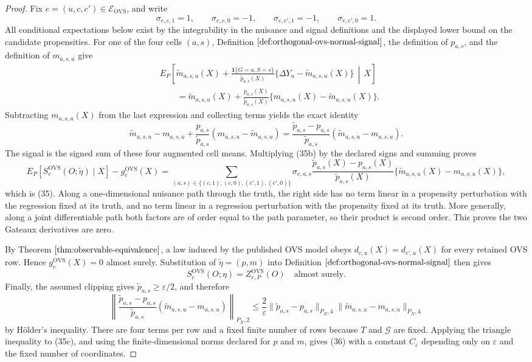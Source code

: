 \documentclass{article}
\begin{document}
\begin{proof}
Fix \(e=(u,c,c')\in\mathcal E_{\mathrm{OVS}}\), and write
\[
\sigma_{e,c,1}=1,\qquad \sigma_{e,c,0}=-1,\qquad
\sigma_{e,c',1}=-1,\qquad \sigma_{e,c',0}=1.
\]
All conditional expectations below exist by the integrability in the nuisance and signal definitions and the displayed lower bound on the candidate propensities.  For one of the four cells \((a,s)\), Definition \(\ref{def:orthogonal-ovs-normal-signal}\), the definition of \(p_{a,s}\), and the definition of \(m_{a,s,u}\) give
\[
\begin{aligned}
&E_P\!\left[\widetilde m_{a,s,u}(X)
+\frac{\mathbf 1\{G=a,S=s\}}{\widetilde p_{a,s}(X)}
 \{\Delta Y_u-\widetilde m_{a,s,u}(X)\}\,\middle|\,X\right]\\
&\qquad=\widetilde m_{a,s,u}(X)
+\frac{p_{a,s}(X)}{\widetilde p_{a,s}(X)}
 \{m_{a,s,u}(X)-\widetilde m_{a,s,u}(X)\}.
\end{aligned}
\tag{35a}
\]
Subtracting \(m_{a,s,u}(X)\) from the last expression and collecting terms yields the exact identity
\[
\widetilde m_{a,s,u}-m_{a,s,u}
+\frac{p_{a,s}}{\widetilde p_{a,s}}(m_{a,s,u}-\widetilde m_{a,s,u})
=\frac{\widetilde p_{a,s}-p_{a,s}}{\widetilde p_{a,s}}
 (\widetilde m_{a,s,u}-m_{a,s,u}).
\tag{35b}
\]
The signal is the signed sum of these four augmented cell means.  Multiplying (35b) by the declared signs and summing proves
\[
E_P[S_e^{\mathrm{OVS}}(O;\widetilde\eta)\mid X]-g_e^{\mathrm{OVS}}(X)
=\sum_{(a,s)\in\{(c,1),(c,0),(c',1),(c',0)\}}
\sigma_{e,a,s}
\frac{\widetilde p_{a,s}(X)-p_{a,s}(X)}{\widetilde p_{a,s}(X)}
\{\widetilde m_{a,s,u}(X)-m_{a,s,u}(X)\},
\]
which is (35).  Along a one-dimensional nuisance path through the truth, the right side has no term linear in a propensity perturbation with the regression fixed at its truth, and no term linear in a regression perturbation with the propensity fixed at its truth.  More generally, along a joint differentiable path both factors are of order equal to the path parameter, so their product is second order.  This proves the two Gateaux derivatives are zero.

By Theorem \(\ref{thm:observable-equivalence}\), a law induced by the published OVS model obeys \(d_{c,u}(X)=d_{c',u}(X)\) for every retained OVS row.  Hence \(g_e^{\mathrm{OVS}}(X)=0\) almost surely.  Substitution of \(\widetilde\eta=(p,m)\) into Definition \(\ref{def:orthogonal-ovs-normal-signal}\) then gives
\[
S_e^{\mathrm{OVS}}(O;\eta)=Z_{e,P}^{\mathrm{OVS}}(O)
\quad\text{almost surely}.
\]
Finally, the assumed clipping gives \(\widetilde p_{a,s}\ge\varepsilon/2\), and therefore
\[
\left\|
\frac{\widetilde p_{a,s}-p_{a,s}}{\widetilde p_{a,s}}
(\widetilde m_{a,s,u}-m_{a,s,u})
\right\|_{P_X,2}
\le \frac{2}{\varepsilon}
\|\widetilde p_{a,s}-p_{a,s}\|_{P_X,4}
\|\widetilde m_{a,s,u}-m_{a,s,u}\|_{P_X,4}
\tag{35c}
\]
by H\"older's inequality.  There are four terms per row and a fixed finite number of rows because \(T\) and \(\mathcal G\) are fixed.  Applying the triangle inequality to (35c), and using the finite-dimensional norms declared for \(p\) and \(m\), gives (36) with a constant \(C_\varepsilon\) depending only on \(\varepsilon\) and the fixed number of coordinates.
\end{proof}
\end{document}
